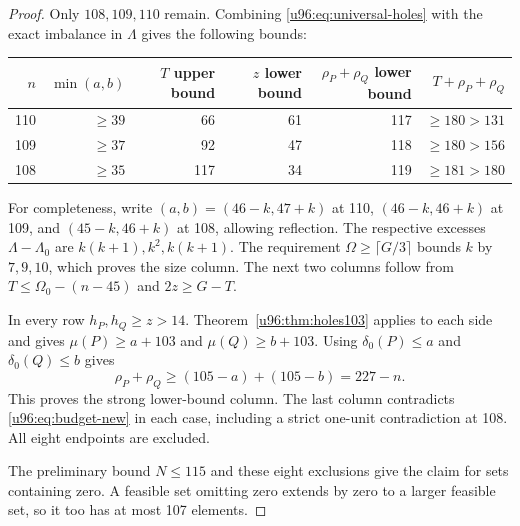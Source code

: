 \documentclass[11pt,a4paper]{article}
\theoremstyle{remark}
\begin{document}
\begin{proof}
Only $108,109,110$ remain. Combining \eqref{u96:eq:universal-holes} with the exact
imbalance in $\Lambda$ gives the following bounds:
\begin{center}
\small
\begin{tabular}{rrrrrr}
\toprule
$n$&$\min(a,b)$&$T$ upper bound&$z$ lower bound&
$\rho_P+\rho_Q$ lower bound&$T+\rho_P+\rho_Q$\\
\midrule
110&$\geq39$&66&61&117&$\geq180>131$\\
109&$\geq37$&92&47&118&$\geq180>156$\\
108&$\geq35$&117&34&119&$\geq181>180$\\
\bottomrule
\end{tabular}
\end{center}
For completeness, write $(a,b)=(46-k,47+k)$ at 110,
$(46-k,46+k)$ at 109, and $(45-k,46+k)$ at 108, allowing reflection.
The respective excesses $\Lambda-\Lambda_0$ are $k(k+1),k^2,k(k+1)$.
The requirement $\Omega\geq\lceil G/3\rceil$ bounds $k$ by $7,9,10$,
which proves the size column. The next two columns follow from
$T\leq\Omega_0-(n-45)$ and $2z\geq G-T$.

In every row $h_P,h_Q\geq z>14$. Theorem~\ref{u96:thm:holes103} applies to
each side and gives $\mu(P)\geq a+103$ and $\mu(Q)\geq b+103$.
Using $\delta_0(P)\leq a$ and $\delta_0(Q)\leq b$ gives
\[
\rho_P+\rho_Q\geq(105-a)+(105-b)=227-n.
\]
This proves the strong lower-bound column. The last column contradicts
\eqref{u96:eq:budget-new} in each case, including a strict one-unit contradiction
at 108. All eight endpoints are excluded.


The preliminary bound $N\leq115$ and these eight exclusions give the
claim for sets containing zero. A feasible set omitting zero extends by
zero to a larger feasible set, so it too has at most 107 elements.
\end{proof}
\end{document}
